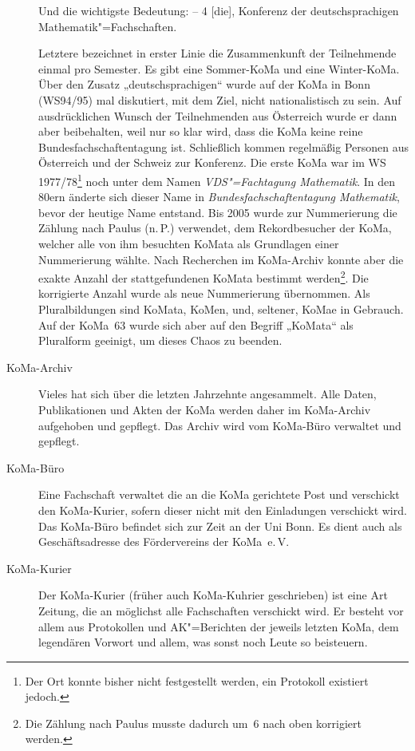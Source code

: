 \begin{description}
	Und die wichtigste Bedeutung: -- 4 [die], Konferenz der deutschsprachigen Mathematik"=Fachschaften.

	Letztere bezeichnet in erster Linie die Zusammenkunft der Teilnehmende einmal pro Semester. Es gibt eine Sommer-KoMa und eine Winter-KoMa. Über den Zusatz „deutschsprachigen“ wurde auf der KoMa in Bonn (WS94/95) mal diskutiert, mit dem Ziel, nicht nationalistisch zu sein. Auf ausdrücklichen Wunsch der Teilnehmenden aus Österreich wurde er dann aber beibehalten, weil nur so klar wird, dass die KoMa keine reine Bundesfachschaftentagung ist. Schließlich kommen regelmäßig Personen aus Österreich und der Schweiz zur Konferenz. Die erste KoMa war im WS 1977/78\footnote{Der Ort konnte bisher nicht festgestellt werden, ein Protokoll existiert jedoch.} noch unter dem Namen \emph{VDS"=Fachtagung Mathematik}. In den 80ern änderte sich dieser Name in \emph{Bundesfachschaftentagung Mathematik}, bevor der heutige Name entstand.  Bis 2005 wurde zur Nummerierung die Zählung nach Paulus (n.\,P.) verwendet, dem Rekordbesucher der KoMa, welcher alle von ihm besuchten KoMata als Grundlagen einer Nummerierung wählte. Nach Recherchen im KoMa-Archiv konnte aber die exakte Anzahl der stattgefundenen KoMata bestimmt werden\footnote{Die Zählung nach Paulus musste dadurch um~6 nach oben korrigiert werden.}. Die korrigierte Anzahl wurde als neue Nummerierung übernommen. Als Pluralbildungen sind KoMata, KoMen, und, seltener, KoMae in Gebrauch. Auf der KoMa~63 wurde sich aber auf den Begriff „KoMata“ als Pluralform geeinigt, um dieses Chaos zu beenden.

\item[KoMa-Archiv]
    Vieles hat sich über die letzten Jahrzehnte angesammelt. Alle Daten, Publikationen und Akten der KoMa werden daher im KoMa-Archiv aufgehoben und gepflegt. Das Archiv wird vom KoMa-Büro verwaltet und gepflegt.

\item[KoMa-Büro]
    Eine Fachschaft verwaltet die an die KoMa gerichtete Post und verschickt den KoMa-Kurier, sofern dieser nicht mit den Einladungen verschickt wird. Das KoMa-Büro befindet sich zur Zeit an der Uni Bonn. Es dient auch als Geschäftsadresse des Fördervereins der KoMa~e.\,V.

\item[KoMa-Kurier]
    Der KoMa-Kurier (früher auch KoMa-Kuhrier geschrieben) ist eine Art Zeitung, die an möglichst alle Fachschaften verschickt wird. Er besteht vor allem aus Protokollen und AK"=Berichten der jeweils letzten KoMa, dem legendären Vorwort und allem, was sonst noch Leute so beisteuern.


\end{description}
